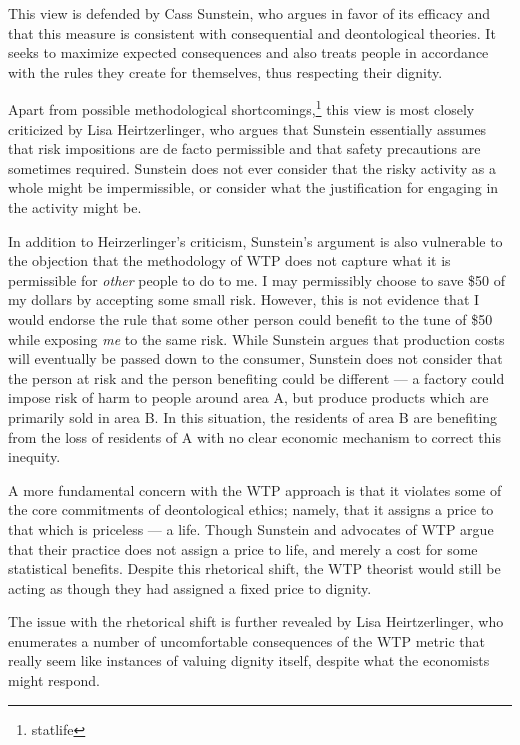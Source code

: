 This view is defended by Cass Sunstein, who argues in favor of its efficacy and
that this measure is consistent with consequential and deontological theories.
It seeks to maximize expected consequences and also treats people in accordance
with the rules they create for themselves, thus respecting their
dignity.\autocite{sunstein_cost_benefit}

Apart from possible methodological shortcomings,\footnote{statlife} this view is
most closely criticized by Lisa Heirtzerlinger, who argues that Sunstein
essentially assumes that risk impositions are de facto permissible and that
safety precautions are sometimes required. Sunstein does not ever consider that
the risky activity as a whole might be impermissible, or consider what the
justification for engaging in the activity might be.

In addition to Heirzerlinger’s criticism, Sunstein’s argument is also
vulnerable to the objection that the methodology of WTP does not capture what
it is permissible for \emph{other} people to do to me. I may permissibly choose
to save \$50 of my dollars by accepting some small risk. However, this is not
evidence that I would endorse the rule that some other person could benefit to
the tune of \$50 while exposing \emph{me} to the same
risk.\autocite[98]{hansson_risk} While Sunstein argues that production costs
will eventually be passed down to the consumer, Sunstein does not consider that
the person at risk and the person benefiting could be different --- a factory
could impose risk of harm to people around area A, but produce products which
are primarily sold in area B. In this situation, the residents of area B are
benefiting from the loss of residents of A with no clear economic mechanism to
correct this inequity.

A more fundamental concern with the WTP approach is that it violates some of
the core commitments of deontological ethics; namely, that it assigns a price
to that which is priceless --- a life. Though Sunstein and advocates of WTP
argue that their practice does not assign a price to life, and merely a cost
for some statistical benefits. Despite this rhetorical shift, the WTP theorist
would still be acting as though they had assigned a fixed price to
dignity.\autocite{kant_uncertainty}

The issue with the rhetorical shift is further revealed by Lisa Heirtzerlinger,
who enumerates a number of uncomfortable consequences of the WTP metric that
really seem like instances of valuing dignity itself, despite what the
economists might respond.

